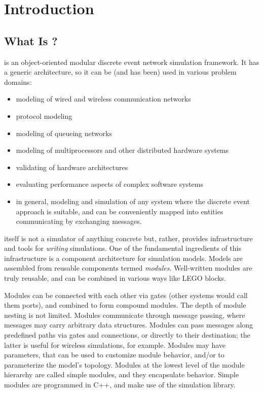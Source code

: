 \chapter{Introduction}
\label{cha:introduction}


\section{What Is {\opp}?}

{\opp} is an object-oriented modular discrete event network simulation
framework. It has a generic architecture, so it can be (and has been)
used in various problem domains:

\begin{itemize}
  \item{modeling of wired and wireless communication networks}
  \item{protocol modeling}
  \item{modeling of queueing networks}
  \item{modeling of multiprocessors and other distributed hardware systems}
  \item{validating of hardware architectures}
  \item{evaluating performance aspects of complex software systems}
  \item{in general, modeling and simulation of
        any system where the discrete event approach is suitable, and
        can be conveniently mapped into entities communicating by exchanging
        messages.}
\end{itemize}

{\opp} itself is not a simulator of anything concrete but, rather,
provides infrastructure and tools for \textit{writing} simulations. One of
the fundamental ingredients of this infrastructure is a component
architecture for simulation models. Models are assembled from reusable
components termed \textit{modules}. Well-written modules are truly reusable,
and can be combined in various ways like LEGO blocks.

Modules can be connected with each other via gates (other systems would
call them ports), and combined to form compound modules. The depth of
module nesting is not limited. Modules communicate through message passing,
where messages may carry arbitrary data structures. Modules can pass
messages along predefined paths via gates and connections, or directly to
their destination; the latter is useful for wireless simulations, for
example. Modules may have parameters, that can be used to customize module
behavior, and/or to parameterize the model's topology.
Modules at the lowest level of the module hierarchy are called
simple modules, and they encapsulate behavior. Simple modules
are programmed in C++, and make use of the simulation library.


